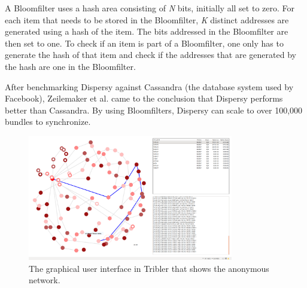 		A Bloomfilter uses a hash area consisting of \emph{N} bits, initially all set to zero. For each item that needs to be stored in the Bloomfilter, \emph{K} distinct addresses are generated using a hash of the item. The bits addressed in the Bloomfilter are then set to one. To check if an item is part of a Bloomfilter, one only has to generate the hash of that item and check if the addresses that are generated by the hash are one in the Bloomfilter.
		
		After benchmarking Dispersy against Cassandra\cite{zeilemaker2013dispersy} (the database system used by Facebook), Zeilemaker et al. came to the conclusion that Dispersy performs better than Cassandra. By using Bloomfilters, Dispersy can scale to over 100,000 bundles to synchronize.
	
		\begin{figure}[!t]
			\centering
			\includegraphics[width=0.8\textwidth]{prior-work/8hop.png}
			\caption{The graphical user interface in Tribler that shows the anonymous network.}
			\label{fig:anon_downloads}
		\end{figure}